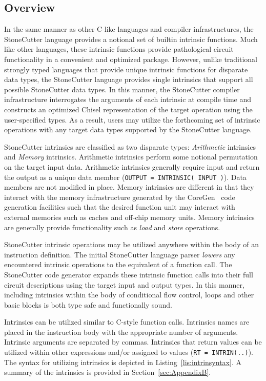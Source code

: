 \documentclass{article}
\begin{document}
\subsection{Overview}
\label{sec:IntrinsicOverview}

In the same manner as other C-like languages and compiler infrastructures, 
the StoneCutter language provides a notional set of builtin intrinsic functions.  
Much like other languages, these intrinsic functions provide pathological 
circuit functionality in a convenient and optimized package.  However, 
unlike traditional strongly typed languages that provide unique intrinsic 
functions for disparate data types, the StoneCutter language provides 
single intrinsics that support all possible StoneCutter data types.  In this manner, 
the StoneCutter compiler infrastructure interrogates the arguments of each intrinsic 
at compile time and constructs an optimized Chisel representation of the target 
operation using the user-specified types.  As a result, users may utilize the forthcoming 
set of intrinsic operations with any target data types supported by the StoneCutter language.  

StoneCutter intrinsics are classified as two disparate types: \textit{Arithmetic} intrinsics and 
\textit{Memory} intrinsics.  Arithmetic intrinsics perform some notional permutation on the target 
input data.  Arithmetic intrinsics generally require input and return the output as a unique data 
member (\texttt{OUTPUT = INTRINSIC( INPUT )}).  Data members are not modified in place.  
Memory intrinsics are different in that they interact with the memory infrastructure generated 
by the CoreGen~\cite{IRSpec} code generation facilities such that the desired function unit may interact with 
external memories such as caches and off-chip memory units.  Memory intrinsics are generally 
provide functionality such as \textit{load} and \textit{store} operations.  

StoneCutter intrinsic operations may be utilized anywhere within the body of an instruction definition.  
The initial StoneCutter language parser \textit{lowers} any encountered intrinsic operations to the equivalent 
of a function call.  The StoneCutter code generator expands these intrinsic function calls into their 
full circuit descriptions using the target input and output types.  In this manner, including intrinsics within 
the body of conditional flow control, loops and other basic blocks is both type safe and functionally sound.    

Intrinsics can be utilized similar to C-style function calls.  Intrinsics names are placed in the instruction body 
with the appropriate number of arguments.  Intrinsic arguments are separated by commas.  Intrinsics that return 
values can be utilized within other expressions and/or assigned to values (\texttt{RT = INTRIN(..)}).  
The syntax for utilizing intrinsics is depicted in Listing~\ref{lis:intrinsyntax}.  A summary of the intrinsics is provided 
in Section~\ref{sec:AppendixB}.    
\end{document}
